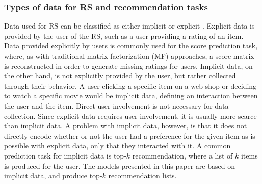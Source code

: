 \subsubsection*{Types of data for RS and recommendation tasks}
Data used for RS can be classified as either implicit or explicit \cite{oard1998implicit}.
Explicit data is provided by the user of the RS, such as a user providing a rating of an item.
Data provided explicitly by users is commonly used for the score prediction task, where, as with traditional matrix factorization (MF) approaches, a score matrix is reconstructed in order to generate missing ratings for users.
Implicit data, on the other hand, is not explicitly provided by the user, but rather collected through their behavior.
A user clicking a specific item on a web-shop or deciding to watch a specific movie would be implicit data, defining an interaction between the user and the item.
Direct user involvement is not necessary for data collection.
Since explicit data requires user involvement, it is usually more scarce than implicit data.
A problem with implicit data, however, is that it does not directly encode whether or not the user had a preference for the given item as is possible with explicit data, only that they interacted with it.
A common prediction task for implicit data is top-$k$ recommendation, where a list of $k$ items is produced for the user.
The models presented in this paper are based on implicit data, and produce top-$k$ recommendation lists. 

